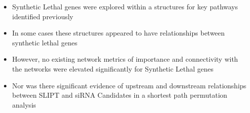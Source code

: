   \begin{itemize}
   \item Synthetic Lethal genes were explored within a  structures for key \glspl{pathway} identified previously 
   
   \bigskip
   
   \item In some cases these  structures appeared to have relationships between \gls{synthetic lethal} genes  
   
   \bigskip
   
   \item However, no existing network metrics of importance and connectivity with the networks were elevated significantly for Synthetic Lethal genes
   
   \bigskip
   
   \item Nor was there significant evidence of upstream and downstream relationships between SLIPT and \gls{siRNA} Candidates in a \gls{shortest path} permutation analysis
  \end{itemize}
  
\clearpage
\fi